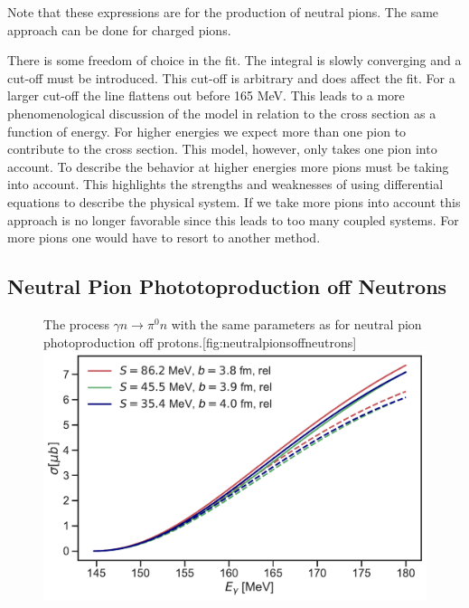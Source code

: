 Note that these expressions are for the production of neutral pions. The same approach can be done for charged pions.

There is some freedom of choice in the fit. The integral is slowly converging and a cut-off must be introduced. This cut-off is arbitrary and does affect the fit. For a larger cut-off the line flattens out before 165 MeV. This leads to a more phenomenological discussion of the model in relation to the cross section as a function of energy. For higher energies we expect more than one pion to contribute to the cross section. This model, however, only takes one pion into account. To describe the behavior at higher energies more pions must be taking into account. This highlights the strengths and weaknesses of using differential equations to describe the physical system. If we take more pions into account this approach is no longer favorable since this leads to too many coupled systems. For more pions one would have to resort to another method.

\subsection{Neutral Pion Phototoproduction off Neutrons}
\begin{figure}[H]
    \begin{sidecaption}{The process $\gamma n \rightarrow \pi^0 n$ with the same parameters as for neutral pion photoproduction off protons.}[fig:neutralpionsoffneutrons]
    \includegraphics[width=\linewidth]{Figures/NeutralPionsOffNeutrons.pdf}
    \end{sidecaption}
\end{figure}
